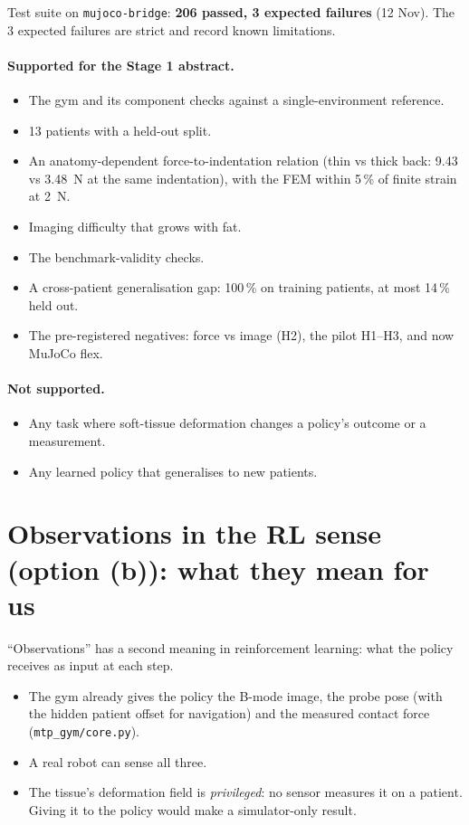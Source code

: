 \documentclass[11pt,a4paper]{article}
\newcommand{\src}[1]{\texttt{\small #1}}
\begin{document}
\noindent Test suite on \src{mujoco-bridge}: \textbf{206 passed, 3 expected failures} (12 Nov). The 3 expected failures are strict and
record known limitations.

\paragraph{Supported for the Stage 1 abstract.}
\begin{itemize}
  \item The gym and its component checks against a single-environment reference.
  \item 13 patients with a held-out split.
  \item An anatomy-dependent force-to-indentation relation (thin vs thick back: 9.43 vs 3.48~N at the same
    indentation), with the FEM within 5\,\% of finite strain at 2~N.
  \item Imaging difficulty that grows with fat.
  \item The benchmark-validity checks.
  \item A cross-patient generalisation gap: 100\,\% on training patients, at most 14\,\% held out.
  \item The pre-registered negatives: force vs image (H2), the pilot H1--H3, and now MuJoCo flex.
\end{itemize}

\paragraph{Not supported.}
\begin{itemize}
  \item Any task where soft-tissue deformation changes a policy's outcome or a measurement.
  \item Any learned policy that generalises to new patients.
\end{itemize}

\section{Observations in the RL sense (option (b)): what they mean for us}

``Observations'' has a second meaning in reinforcement learning: what the policy receives as input at each step.
\begin{itemize}
  \item The gym already gives the policy the B-mode image, the probe pose (with the hidden patient offset for
    navigation) and the measured contact force (\src{mtp\_gym/core.py}).
  \item A real robot can sense all three.
  \item The tissue's deformation field is \emph{privileged}: no sensor measures it on a patient. Giving it to the
    policy would make a simulator-only result.
\end{itemize}
\end{document}
